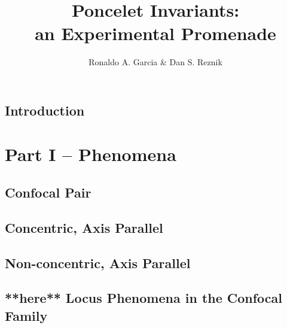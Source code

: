 \documentclass{book}
\begin{document}
\title{Poncelet Invariants:\\an Experimental Promenade}

\author{Ronaldo A. Garcia \& Dan S. Reznik} 
\maketitle

\chapter{Introduction}
\label{chap:01-intro}


\part{Part I --  Phenomena}

\chapter{Confocal Pair}
\label{chap:03-n3-confocal}


\chapter{Concentric, Axis Parallel}
\label{chap:03-n3-cap}


\chapter{Non-concentric, Axis Parallel}
\label{chap:03-n3-ncap}


\chapter[Confocal Loci]{**here** Locus Phenomena in the Confocal Family}
\label{chap:04-confocal-loci}

\end{document}

